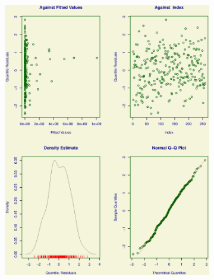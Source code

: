 \documentclass[
]{article}
\begin{document}
\begin{figure}
\centering
\begin{subfigure}[b]{0.5\textwidth}
   \includegraphics[width=1\linewidth]{ROC_4Plot_ZAIG.eps}
   \caption{}
   \label{Residuals_ZAIG} 
\end{subfigure}


\end{figure}
\end{document}
